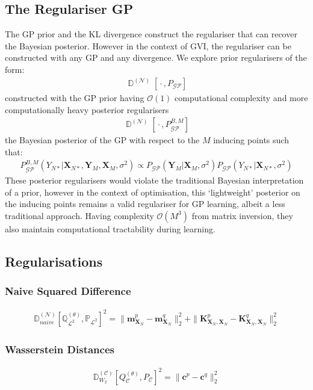 \documentclass{article}
\newcommand{\D}{\operatorname{\mathbb{D}}}
\newcommand{\GP}{\operatorname{\mathcal{GP}}}
\newcommand{\wc}{\operatorname{{}\cdot{}}}
\numberwithin{equation}{section}
\begin{document}
\subsection{The Regulariser GP}
The GP prior and the KL divergence construct the regulariser that can recover the Bayesian posterior. However in the context of GVI, the regulariser can be constructed with any GP and any divergence. We explore prior regularisers of the form:
\begin{align}
    \D^{(\mathcal{N})}\left[\wc, P_{\GP}\right]
    \label{prior-regulariser}
\end{align}
constructed with the GP prior having $\mathcal{O}(1)$ computational complexity and more computationally heavy posterior regularisers
\begin{align}
    \D^{(\mathcal{N})}\left[\wc, P^{B, M}_{\GP}\right]
    \label{posterior-regulariser}
\end{align}
the Bayesian posterior of the GP with respect to the $M$ inducing points such that:
\begin{align}
    P^{B, M}_{\GP}\left(Y_{N*} \vert \mathbf{X}_{N*}, \mathbf{Y}_M, \mathbf{X}_M, \sigma^2\right) \propto P_{\GP}\left(\mathbf{Y}_M \vert \mathbf{X}_M, \sigma^2\right) P_{\GP}\left(Y_{N*} \vert \mathbf{X}_{N*}, \sigma^2\right)
\end{align}
These posterior regularisers would violate the traditional Bayesian interpretation of a prior, however in the context of optimisation, this `lightweight' posterior on the inducing points remains a valid regulariser for GP learning, albeit a less traditional approach. Having complexity $\mathcal{O}(M^3)$ from matrix inversion, they also maintain computational tractability during learning.

\subsection{Regularisations}
\subsubsection{Naive Squared Difference}
\begin{align}
    \mathbb{D}_{naive}^{(\mathcal{N})} \left[\mathbb{Q}^{(\theta)}_{\mathcal{L}^2}, \mathbb{P}_{\mathcal{L}^2}\right]^2 = \|\mathbf{m}_{\mathbf{X}_N}^p - \mathbf{m}_{\mathbf{X}_N}^q\|_2^2 + \|\mathbf{K}_{\mathbf{X}_N, \mathbf{X}_N}^p - \mathbf{K}_{\mathbf{X}_N, \mathbf{X}_N}^q\|_2^2
\end{align}
\subsubsection{Wasserstein Distances}
\begin{align}
    \mathbb{D}_{W_2}^{(\mathcal{C})} \left[Q^{(\theta)}_{\mathcal{C}}, P_{\mathcal{C}}\right]^2 = \|\mathbf{c}^p - \mathbf{c}^q\|_2^2
\end{align}
\end{document}
